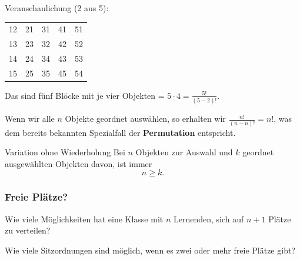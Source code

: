Veranschaulichung (2 aus 5):

\begin{tabular}{c|c|c|c|c}
12 & 21 & 31 & 41 & 51\\
13 & 23 & 32 & 42 & 52\\
14 & 24 & 34 & 43 & 53\\
15 & 25 & 35 & 45 & 54\\
\end{tabular}

Das sind fünf Blöcke mit je vier Objekten = $5\cdot{}4 = \frac{5!}{(5-2)!}$.
\newpage

\begin{bemerkung}{}{}
Wenn wir alle $n$ Objekte geordnet auswählen, so erhalten wir
$\frac{n!}{(n-n)!} = n!$, was dem bereits bekannten Spezialfall der \textbf{Permutation}
entspricht.
\end{bemerkung}



\begin{gesetz}{Variation ohne Wiederholung}{}
Bei $n$ Objekten zur Auswahl und $k$ geordnet ausgewählten Objekten davon, ist immer
$$n \ge{} k.$$
\end{gesetz}
\newpage

\subsubsection{Freie Plätze?}

Wie viele Möglichkeiten hat eine Klasse mit $n$ Lernenden, sich auf
$n+1$ Plätze zu verteilen?


Wie viele Sitzordnungen sind möglich, wenn es zwei oder mehr freie Plätze gibt?

